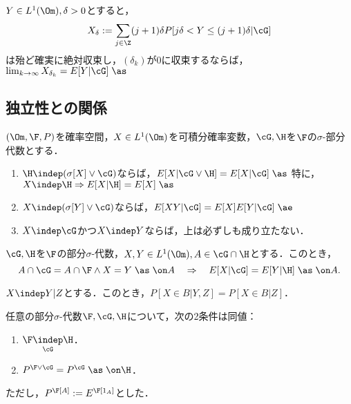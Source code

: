 \documentclass[uplatex,dvipdfmx]{jsreport}
\begin{document}
\begin{theorem}
    $Y\in L^1(\Om),\delta>0$とすると，
    \[X_\delta:=\sum_{j\in\Z}(j+1)\delta P[j\delta<Y\le(j+1)\delta|\cG]\]
    は殆ど確実に絶対収束し，$(\delta_k)$が$0$に収束するならば，$\lim_{k\to\infty}X_{\delta_k}=E[Y|\cG]\;\as$
\end{theorem}


\subsection{独立性との関係}

\begin{proposition}
    $(\Om,\F,P)$を確率空間，$X\in L^1(\Om)$を可積分確率変数，$\cG,\H$を$\F$の$\sigma$-部分代数とする．
    \begin{enumerate}
        \item $\H\indep(\sigma[X]\lor\cG)$ならば，$E[X|\cG\lor\H]=E[X|\cG]\;\as$ 特に，$X\indep\H\Rightarrow E[X|\H]=E[X]\;\as$
        \item $X\indep(\sigma[Y]\lor\cG)$ならば，$E[XY|\cG]=E[X]E[Y|\cG]\;\ae$
        \item $X\indep\cG$かつ$X\indep Y$ならば，上は必ずしも成り立たない．
    \end{enumerate}
\end{proposition}

\begin{lemma}
    $\cG,\H$を$\F$の部分$\sigma$-代数，$X,Y\in L^1(\Om),A\in\cG\cap\H$とする．このとき，
    \[A\cap\cG=A\cap\F\land X=Y\;\as\;\on A\quad\Rightarrow\quad E[X|\cG]=E[Y|\H]\;\as\;\on A.\]
\end{lemma}

\begin{proposition}[Doob]
    $X\indep Y|Z$とする．このとき，$P[X\in B|Y,Z]=P[X\in B|Z]$．
\end{proposition}

\begin{theorem}[条件付き独立]
    任意の部分$\sigma$-代数$\F,\cG,\H$について，次の2条件は同値：
    \begin{enumerate}
        \item $\F\underset{\cG}{\indep}\H$．
        \item $P^{\F\lor\cG}=P^\cG\;\as\;\on\H$．
    \end{enumerate}
    ただし，$P^\F[A]:=E^\F[1_A]$とした．
\end{theorem}
\begin{remarks}
    
\end{remarks}
\end{document}
